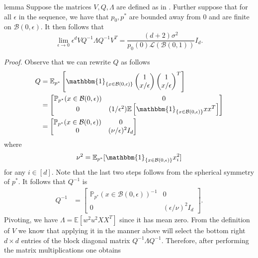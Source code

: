 \documentclass[11pt]{article}
\begin{document}
\begin{restatable}{lemma}{} \label{lemma: asymptotic var bound}
    Suppose the matrices $V, Q, \Lambda$ are defined as in . Further suppose that for all $\epsilon$ in the sequence, we have that $p_0, p^*$ are bounded away from $0$ and are finite on $\mathcal{B}(0, \epsilon)$. It then follows that
    \[ \lim_{\epsilon \rightarrow 0}\epsilon^dVQ^{-1}\Lambda Q^{-1}V^T = \frac{(d+2)\sigma^2}{p_0(0)\mathcal{L}(\mathcal{B}(0,1))}I_d.\]
\end{restatable}
\noindent \textit{Proof.} Observe that we can rewrite $Q$ as follows
\begin{align*}
    Q &= \mathbb{E}_{p^*}\left[\mathbbm{1}_{\{x \in \mathcal{B}(0, \epsilon)\}}\begin{pmatrix}
        1 \\ x/\epsilon
    \end{pmatrix}\begin{pmatrix}
        1 \\ x/\epsilon
    \end{pmatrix}^T\right] \\
    &= \begin{bmatrix}
         \mathbb{P}_{p^*}(x \in \mathcal{B}(0, \epsilon)) & 0 \\
         0 & (1/\epsilon^2)\mathbb{E}\left[\mathbbm{1}_{\{x \in \mathcal{B}(0, \epsilon)\}}xx^T\right]
    \end{bmatrix} \\
    &= \begin{bmatrix}
         \mathbb{P}_{p^*}(x \in \mathcal{B}(0, \epsilon)) & 0 \\
         0 & (\nu/\epsilon)^2I_d
    \end{bmatrix}
\end{align*}
where
\begin{equation*}
\nu^2 = \mathbb{E}_{p^*}[\mathbbm{1}_{\{x \in \mathcal{B}(0, \epsilon)\}}x_i^2]
\end{equation*}
for any $i \in [d]$. Note that the last two steps follows from the spherical symmetry of $p^*$. It follows that $Q^{-1}$ is
\begin{align} \label{eq: Q closed form}
    Q^{-1} &= \begin{bmatrix}
         \mathbb{P}_{p^*}(x \in \mathcal{B}(0, \epsilon))^{-1} & 0 \\
         0 & (\epsilon/\nu)^{2}I_d
    \end{bmatrix}.
\end{align}
Pivoting, we have $\Lambda = \mathbb{E}[w^2u^2XX^T]$ since it has mean zero. From the definition of $V$ we know that applying it in the manner above will select the bottom right $d\times d$ entries of the block diagonal matrix $Q^{-1}\Lambda Q^{-1}$. Therefore, after performing the matrix multiplications one obtains
\end{document}
